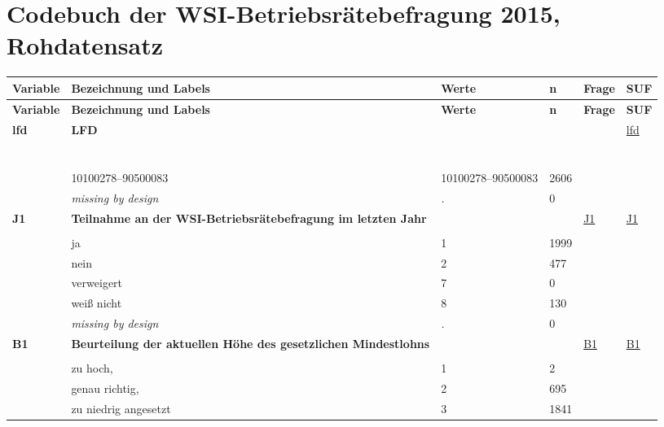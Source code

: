 \section{Codebuch der WSI-Betriebsrätebefragung 2015, Rohdatensatz}\label{kap_rohdaten}
\begin{longtable}{| L{2.45cm} | L{6cm} | C{1.5cm} | R{1cm} | C{2.25cm} | C{2.25cm} |}
\toprule
\textbf{Variable} & \textbf{Bezeichnung und Labels}& \textbf{Werte} &  \textbf{n} & \textbf{Frage} & \textbf{SUF} \\
\midrule
\endfirsthead
\toprule
\textbf{Variable} & \textbf{Bezeichnung und Labels}& \textbf{Werte} & \textbf{n} & \textbf{Frage} & \textbf{SUF} \\
\midrule
\endhead
\midrule
\endfoot
\bottomrule
\endlastfoot
 \textbf{lfd}\label{var:lfd} & \textbf{LFD} &  &  &  & \hyperref[var:suf:lfd]{lfd} \\ 
   & \protect\subsection[Variablen lfd bis B24]{} &  &  &  &  \\ 
   & 10100278--90500083 & 10100278--90500083 & 2606 &  &  \\ 
   & \textit{missing by design} & \textit{.} & 0 &  &  \\ 
   \midrule
\textbf{J1}\label{var:J1} & \textbf{Teilnahme an der WSI-Betriebsrätebefragung im letzten Jahr} &  &  & \hyperref[J1]{J1} & \hyperref[var:suf:J1]{J1} \\ 
   &  &  &  &  &  \\ 
   & ja & 1 & 1999 &  &  \\ 
   & nein & 2 & 477 &  &  \\ 
   & verweigert & 7 & 0 &  &  \\ 
   & weiß nicht & 8 & 130 &  &  \\ 
   & \textit{missing by design} & \textit{.} & 0 &  &  \\ 
   \midrule
\textbf{B1}\label{var:B1} & \textbf{Beurteilung der aktuellen Höhe des gesetzlichen Mindestlohns} &  &  & \hyperref[B1]{B1} & \hyperref[var:suf:B1]{B1} \\ 
   &  &  &  &  &  \\ 
   & zu hoch, & 1 & 2 &  &  \\ 
   & genau richtig, & 2 & 695 &  &  \\ 
   & zu niedrig angesetzt & 3 & 1841 &  &  \\ 

\end{longtable}
